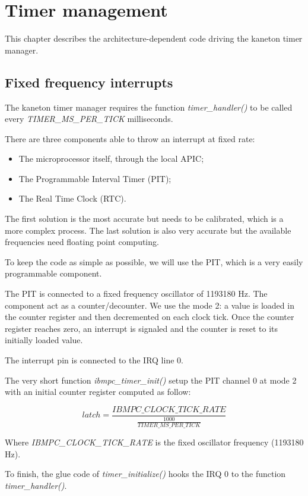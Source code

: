 %
%
%
%
%
%

%
%

\chapter{Timer management}

This chapter describes the architecture-dependent code driving the
kaneton timer manager.

\newpage

%
%

\section{Fixed frequency interrupts}

The kaneton timer manager requires the function
\textit{timer\_handler()} to be called every
\textit{TIMER\_MS\_PER\_TICK} milliseconds.

There are three components able to throw an interrupt at fixed rate:

\begin{itemize}
  \item
    The microprocessor itself, through the local APIC;
  \item
    The Programmable Interval Timer (PIT);
  \item
    The Real Time Clock (RTC).
\end{itemize}

The first solution is the most accurate but needs to be calibrated,
which is a more complex process. The last solution is also very
accurate but the available frequencies need floating point computing.

To keep the code as simple as possible, we will use the PIT, which is
a very easily programmable component.

The PIT is connected to a fixed frequency oscillator of 1193180
Hz. The component act as a counter/decounter. We use the mode 2: a
value is loaded in the counter register and then decremented on each
clock tick. Once the counter register reaches zero, an interrupt is
signaled and the counter is reset to its initially loaded value.

The interrupt pin is connected to the IRQ line 0.

The very short function \textit{ibmpc\_timer\_init()} setup the PIT
channel 0 at mode 2 with an initial counter register computed as
follow:

$$
latch = \frac{IBMPC\_CLOCK\_TICK\_RATE}{\frac{1000}{TIMER\_MS\_PER\_TICK}}
$$

Where \textit{IBMPC\_CLOCK\_TICK\_RATE} is the fixed oscillator
frequency (1193180 Hz).

To finish, the glue code of \textit{timer\_initialize()} hooks the IRQ
0 to the function \textit{timer\_handler()}.
